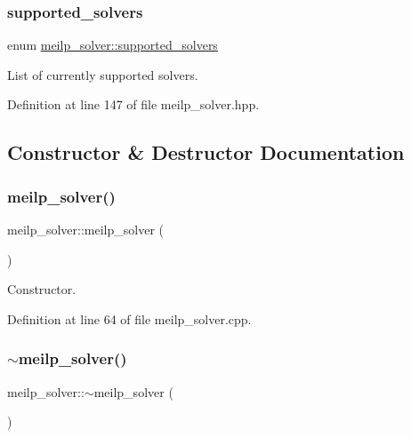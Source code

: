 \subsubsection{\texorpdfstring{supported\+\_\+solvers}{supported\_solvers}}
{\footnotesize\ttfamily enum \hyperlink{classmeilp__solver_ac258f0ae8866c02ac01796f22db67b7a}{meilp\+\_\+solver\+::supported\+\_\+solvers}}



List of currently supported solvers. 



Definition at line 147 of file meilp\+\_\+solver.\+hpp.



\subsection{Constructor \& Destructor Documentation}
\mbox{\label{classmeilp__solver_a36ff660134675780ed9ef03c9d22847d}} 
\subsubsection{\texorpdfstring{meilp\+\_\+solver()}{meilp\_solver()}}
{\footnotesize\ttfamily meilp\+\_\+solver\+::meilp\+\_\+solver (\begin{DoxyParamCaption}{ }\end{DoxyParamCaption})\hspace{0.3cm}{\ttfamily [protected]}}



Constructor. 



Definition at line 64 of file meilp\+\_\+solver.\+cpp.

\mbox{\label{classmeilp__solver_aeffc63d25af700718897972f6f5dbff6}} 
\subsubsection{\texorpdfstring{$\sim$meilp\+\_\+solver()}{~meilp\_solver()}}
{\footnotesize\ttfamily meilp\+\_\+solver\+::$\sim$meilp\+\_\+solver (\begin{DoxyParamCaption}{ }\end{DoxyParamCaption})\hspace{0.3cm}{\ttfamily [virtual]}}



